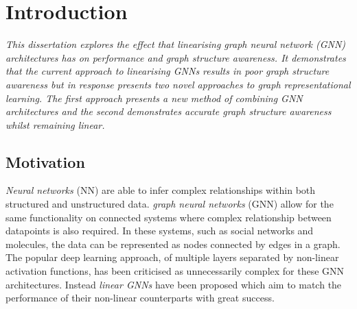 \chapter{Introduction}


\emph{
    This dissertation explores the effect that linearising graph neural network (GNN) architectures has on performance and graph structure awareness.
    It demonstrates that the current approach to linearising GNNs results in poor graph structure awareness but in response presents two novel approaches to graph representational learning.
    The first approach presents a new method of combining GNN architectures and the second demonstrates accurate graph structure awareness whilst remaining linear.
}

\section{Motivation}
\label{sec:motivation}




\emph{Neural networks} (NN) are able to infer complex relationships within both structured and unstructured data.
\emph{graph neural networks} (GNN) allow for the same functionality on connected systems where complex relationship between datapoints is also required.
In these systems, such as social networks and molecules, the data can be represented as nodes connected by edges in a graph.
The popular deep learning approach, of multiple layers separated by non-linear activation functions, has been criticised as unnecessarily complex for these GNN architectures.
Instead \emph{linear GNNs} have been proposed which aim to match the performance of their non-linear counterparts with great success.


